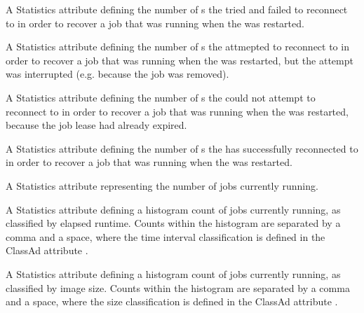 \begin{description}
\item[\AdAttr{JobsRestartReconnectsFailed}:]
  A Statistics attribute defining the number of s the
   tried and failed to reconnect to in order to
  recover a job that was running when the  was restarted.

\item[\AdAttr{JobsRestartReconnectsInterrupted}:]
  A Statistics attribute defining the number of s the
   attmepted to reconnect to in order to
  recover a job that was running when the  was restarted,
  but the attempt was interrupted (e.g. because the job was removed).

\item[\AdAttr{JobsRestartReconnectsLeaseExpired}:]
  A Statistics attribute defining the number of s the
   could not attempt to reconnect to in order to
  recover a job that was running when the  was restarted,
  because the job lease had already expired.

\item[\AdAttr{JobsRestartReconnectsSucceeded}:]
  A Statistics attribute defining the number of s the
   has successfully reconnected to in order to
  recover a job that was running when the  was restarted.

\item[\AdAttr{JobsRunning}:]  A Statistics attribute representing the number
  of jobs currently running.

\item[\AdAttr{JobsRunningRuntimes}:] A Statistics attribute defining
  a histogram count of jobs currently running,
  as classified by elapsed runtime.
  Counts within the histogram are separated by a comma and a space, 
  where the time interval classification is defined in the ClassAd attribute
  .

\item[\AdAttr{JobsRunningSizes}:] A Statistics attribute defining
  a histogram count of jobs currently running,
  as classified by image size.
  Counts within the histogram are separated by a comma and a space, 
  where the size classification is defined in the ClassAd attribute
  .


\end{description}
